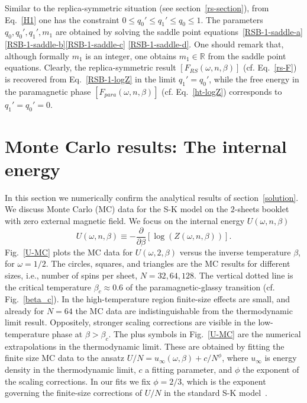 \documentclass[twocolumn,superscriptaddress,prb,10pt]{revtex4-1}
\begin{document}
%
Similar to the replica-symmetric situation (see section~\ref{rs-section}), 
from Eq.~\eqref{H1} one has the constraint $0\le q_0'\le q_1'\le q_0\le 1$.
The parameters $q_0,q_0',q_1',m_1$ are obtained by solving the saddle 
point equations~\eqref{RSB-1-saddle-a}\eqref{RSB-1-saddle-b}\eqref{RSB-1-saddle-c}
\eqref{RSB-1-saddle-d}. One should remark that, although formally $m_1$ is an 
integer, one obtains $m_1\in\mathbb{R}$ from the saddle point equations. 
Clearly, the replica-symmetric result $[F_{RS}(\omega,n,\beta)]$ (cf. 
Eq.~\eqref{rs-F}) is recovered from Eq.~\eqref{RSB-1-logZ} in the limit 
$q_1'=q_0'$, while the free energy in the paramagnetic phase $[F_{para}(\omega,n,
\beta)]$ (cf. Eq.~\eqref{ht-logZ}) corresponds to $q_1'=q_0'=0$.

\section{Monte Carlo results: The internal energy}
\label{mc-results}

In this section we numerically confirm the analytical results of section~\ref{solution}. 
We discuss Monte Carlo (MC) data for the S-K model on the $2$-sheets booklet 
with zero external magnetic field. We focus on the internal energy $U(\omega,n,
\beta)$ 
%
\begin{equation}
\label{U-def}
U(\omega,n,\beta)\equiv-\frac{\partial}{\partial\beta}
[\log(Z(\omega,n,\beta))]. 
\end{equation}
%  
Fig.~\ref{U-MC} plots the MC data for $U(\omega,2,\beta)$ versus the inverse temperature 
$\beta$, for $\omega=1/2$. The circles, squares, and triangles are the MC results for 
different sizes, i.e., number of spins per sheet, $N=32,64,128$. The vertical dotted line 
is the critical temperature $\beta_c\approx 0.6$ of the paramagnetic-glassy transition 
(cf. Fig.~\ref{beta_c}). In the high-temperature region finite-size effects are small, 
and already for $N=64$ the MC data are indistinguishable from the thermodynamic limit 
result. Oppositely, stronger scaling corrections are visible in the low-temperature phase at 
$\beta>\beta_c$. The plus symbols in Fig.~\ref{U-MC} are the numerical extrapolations in 
the thermodynamic limit. These are obtained by fitting the finite size MC data 
to the ansatz $U/N=u_{\infty}(\omega,\beta)+c/N^{\phi}$, where 
$u_{\infty}$ is energy density in the thermodynamic limit, $c$ a fitting parameter, and 
$\phi$ the exponent of the scaling corrections. In our fits we fix $\phi=2/3$, which 
is the exponent governing the finite-size corrections of $U/N$ in 
the standard S-K model~\cite{billoire-2007,aspelmeier-2008}. 
\end{document}

